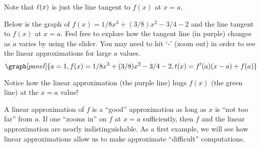 \documentclass[handout,nooutcomes]{ximera}
\begin{document}
\begin{example}
Note that $\ell(x)$ is just the line tangent to $f(x)$ at $x=a$.


\begin{example}
Below is the graph of $f(x) = 1/8x^3 + (3/8)x^2 -3/4 - 2$ and the line
tangent to $f(x)$ at $x=a$. Feel free to explore how the tangent line
(in purple) changes as $a$ varies by using the slider. You may need to
hit `-' (zoom out) in order to see the linear approximations for large $a$ values.
\[
\graph[panel]{a=1, f(x) = 1/8x^3 + (3/8)x^2 -3/4 - 2, t(x) = f'(a)(x-a)+ f(a)}
\]

Notice how the linear approximation (the purple line) hugs
$f(x)$ (the green line) at the $x=a$ value!
\end{example}

A linear approximation of $f$ is a ``good'' approximation as long as
$x$ is ``not too far'' from $a$.
If one ``zooms in'' on $f$ at $x=a$ sufficiently, then $f$ and the linear
approximation are nearly indistinguishable. As a first example, we
will see how linear approximations allow us to make approximate
``difficult'' computations.
\end{example}
\end{document}
